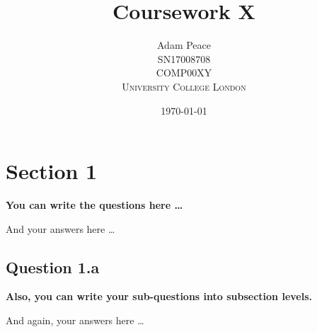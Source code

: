 \documentclass[12pt]{article}
\title{Coursework X} %
\author{Adam Peace\\
SN17008708\\
COMP00XY\\ %
\textsc{University College London}
}
\date{\today} %
\begin{document}
\setlength{\droptitle}{-5em}    
\maketitle

\section*{Section 1}
{\bfseries You can write the questions here \ldots}

And your answers here \ldots

\subsection*{Question 1.a}
{\bfseries Also, you can write your sub-questions into subsection levels.}

And again, your answers here \ldots

\nocite{*}

% 
\end{document}
